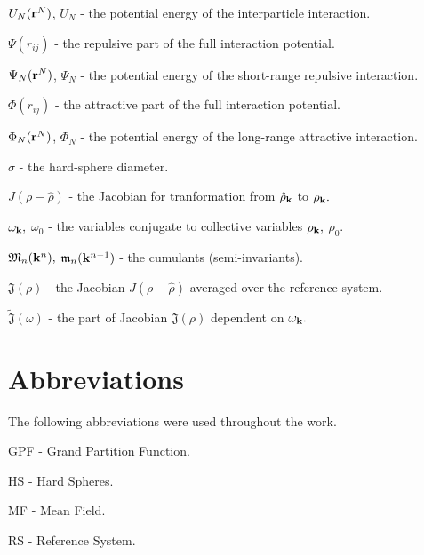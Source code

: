 $U_N(\vb r^N)$, $U_N$ - the potential energy of the interparticle interaction.

$\Psi(r_{ij})$ - the repulsive part of the full interaction potential.

$\Psi_N(\vb r^N)$, $\Psi_N$ - the potential energy of the short-range repulsive interaction.

$\Phi(r_{ij})$ - the attractive part of the full interaction potential. 

$\Phi_N(\vb r^N)$, $\Phi_N$ - the potential energy of the long-range attractive interaction.

$\sigma$ - the hard-sphere diameter. 

$J(\rho - \hat{\rho})$ - the Jacobian for tranformation from $\hat{\rho}_{\vb k}$ to $\rho_{\vb k}.$

$\omega_{\vb k},$ $\omega_0$ - the variables conjugate to collective variables $\rho_{\vb k},$ $\rho_0.$

$\mathfrak{M}_n(\vb k^n),$ $\mathfrak{m}_n(\vb k^{n-1})$ - the cumulants (semi-invariants).

$\mathfrak{J}(\rho)$ - the Jacobian $J(\rho - \hat{\rho})$ averaged over the reference system.

$\tilde{\mathfrak{J}}(\omega)$ - the part of Jacobian $\mathfrak{J}(\rho)$ dependent on $\omega_{\vb k}.$

\section*{Abbreviations}
The following abbreviations were used throughout the work.

GPF - Grand Partition Function.

HS - Hard Spheres.

MF - Mean Field.

RS - Reference System.